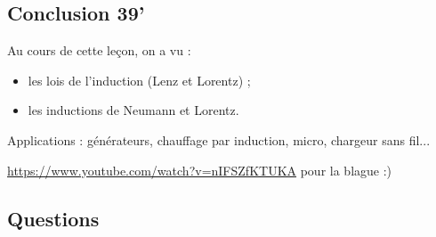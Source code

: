 \subsection*{Conclusion 39'}

Au cours de cette leçon, on a vu :
\begin{itemize}
\item les lois de l'induction (Lenz et Lorentz) ;
\item les inductions de Neumann et Lorentz.
\end{itemize}

\begin{slide}
Applications : générateurs, chauffage par induction, micro, chargeur sans fil...
\end{slide}

\begin{slide}
\href{Railgun de l'espace}{https://www.youtube.com/watch?v=nIFSZfKTUKA} pour la blague :)	
\end{slide}


\subsection*{Questions}

